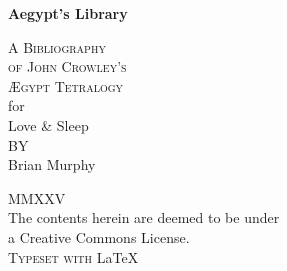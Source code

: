 

\pagestyle{empty}
\addtocounter{page}{-1}
\begin{center}
\bfseries
\nbvspace[0.5]
\Huge
\egothfamily
{\nbtitlestretch\fontsize{42pt}{48pt}\selectfont
Aegypt's Library}


\nbvspace[1]
\normalsize
\rmfamily
\textsc{A Bibliography\\
of John Crowley's\\
Ægypt Tetralogy}\\
\nbvspace[1]
\footnotesize for\\
\Huge Love \& Sleep\\[0.5em]
\small BY\\[0.5em]
\Large Brian Murphy\\




\nbvspace[1]

\shadowoffset{1pt}
\shadowtext{%
{\color{Mahogany}\fontsize{50}{54}\staveLXI}}
\nbvspace[1]
\normalsize


\textcopyleft \egothfamily MMXXV\\
\large
\rmfamily
\footnotesize The contents herein are deemed to be under  \\
a Creative Commons License.\\
\nbvspace[1]
\textsc{Typeset with} \LaTeX{}
\nbvspace[1]
\end{center}




